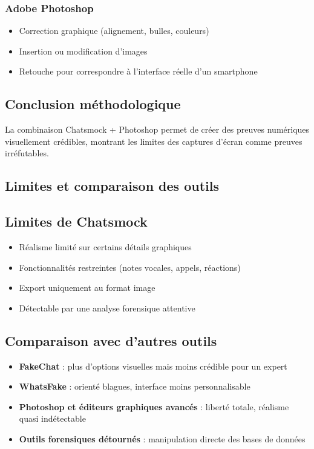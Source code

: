 \documentclass[12pt]{article}
\begin{document}
\begin{center}
\subsubsection{ Adobe Photoshop}
\begin{itemize}[leftmargin=*, label=\textbullet]
    \item Correction graphique (alignement, bulles, couleurs)
    \item Insertion ou modification d’images
    \item Retouche pour correspondre à l'interface réelle d'un smartphone
\end{itemize}

\subsection*{Conclusion méthodologique}
La combinaison Chatsmock + Photoshop permet de créer des preuves numériques visuellement crédibles, montrant les limites des captures d'écran comme preuves irréfutables.

\subsection{ Limites et comparaison des outils}
\subsection{ Limites de Chatsmock}
\begin{itemize}[leftmargin=*, label=\textbullet]
    \item Réalisme limité sur certains détails graphiques
    \item Fonctionnalités restreintes (notes vocales, appels, réactions)
    \item Export uniquement au format image
    \item Détectable par une analyse forensique attentive
\end{itemize}

\subsection{ Comparaison avec d'autres outils}
\begin{itemize}[leftmargin=*, label=\textbullet]
    \item \textbf{FakeChat} : plus d’options visuelles mais moins crédible pour un expert
    \item \textbf{WhatsFake} : orienté blagues, interface moins personnalisable
    \item \textbf{Photoshop et éditeurs graphiques avancés} : liberté totale, réalisme quasi indétectable
    \item \textbf{Outils forensiques détournés} : manipulation directe des bases de données
\end{itemize}


\end{center}
\end{document}
